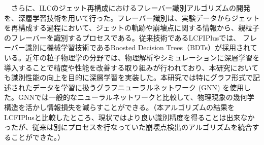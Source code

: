 　さらに、ILCのジェット再構成におけるフレーバー識別アルゴリズムの開発を、深層学習技術を用いて行った。フレーバー識別は、実験データからジェットを再構成する過程において、ジェットの軌跡や崩壊点に関する情報から、親粒子のフレーバーを識別するプロセスである。従来技術であるLCFIPlusでは、 フレーバー識別に機械学習技術であるBoosted Decision Trees（BDTs）が採用されている。近年の粒子物理学の分野では、物理解析やシミュレーションに深層学習を導入することで精度や性能を改善する取り組みが行われており、本研究においても識別性能の向上を目的に深層学習を実装した。本研究では特にグラフ形式で記述されたデータを学習に扱うグラフニューラルネットワーク (GNN) を使用した。GNNでは一般的なニューラルネットワークと比較して、物理現象の幾何学構造を活かし情報損失を減らすことができる。（本アルゴリズムの結果をLCFIPlusと比較したところ、現状ではより良い識別精度を得ることは出来なかったが、従来は別にプロセスを行なっていた崩壊点検出のアルゴリズムを統合することができた。）